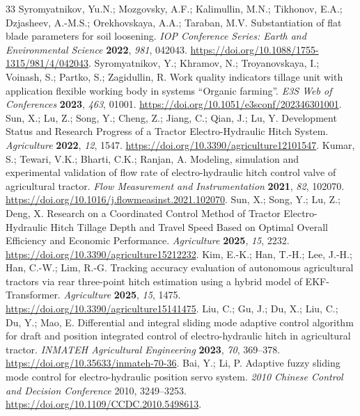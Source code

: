 \begin{thebibliography}{33}
 Syromyatnikov, Yu.N.; Mozgovsky, A.F.; Kalimullin, M.N.; Tikhonov, E.A.; Dzjasheev, A.-M.S.; Orekhovskaya, A.A.; Taraban, M.V. Substantiation of flat blade parameters for soil loosening. \emph{IOP Conference Series: Earth and Environmental Science} \textbf{2022}, \emph{981}, 042043. \url{https://doi.org/10.1088/1755-1315/981/4/042043}.
 Syromyatnikov, Y.; Khramov, N.; Troyanovskaya, I.; Voinash, S.; Partko, S.; Zagidullin, R. Work quality indicators tillage unit with application flexible working body in systems ``Organic farming''. \emph{E3S Web of Conferences} \textbf{2023}, \emph{463}, 01001. \url{https://doi.org/10.1051/e3sconf/202346301001}.
 Sun, X.; Lu, Z.; Song, Y.; Cheng, Z.; Jiang, C.; Qian, J.; Lu, Y. Development Status and Research Progress of a Tractor Electro-Hydraulic Hitch System. \emph{Agriculture} \textbf{2022}, \emph{12}, 1547. \url{https://doi.org/10.3390/agriculture12101547}.
 Kumar, S.; Tewari, V.K.; Bharti, C.K.; Ranjan, A. Modeling, simulation and experimental validation of flow rate of electro-hydraulic hitch control valve of agricultural tractor. \emph{Flow Measurement and Instrumentation} \textbf{2021}, \emph{82}, 102070. \url{https://doi.org/10.1016/j.flowmeasinst.2021.102070}.
 Sun, X.; Song, Y.; Lu, Z.; Deng, X. Research on a Coordinated Control Method of Tractor Electro-Hydraulic Hitch Tillage Depth and Travel Speed Based on Optimal Overall Efficiency and Economic Performance. \emph{Agriculture} \textbf{2025}, \emph{15}, 2232. \url{https://doi.org/10.3390/agriculture15212232}.
 Kim, E.-K.; Han, T.-H.; Lee, J.-H.; Han, C.-W.; Lim, R.-G. Tracking accuracy evaluation of autonomous agricultural tractors via rear three-point hitch estimation using a hybrid model of EKF-Transformer. \emph{Agriculture} \textbf{2025}, \emph{15}, 1475. \url{https://doi.org/10.3390/agriculture15141475}.
 Liu, C.; Gu, J.; Du, X.; Liu, C.; Du, Y.; Mao, E. Differential and integral sliding mode adaptive control algorithm for draft and position integrated control of electro-hydraulic hitch in agricultural tractor. \emph{INMATEH Agricultural Engineering} \textbf{2023}, \emph{70}, 369--378. \url{https://doi.org/10.35633/inmateh-70-36}.
 Bai, Y.; Li, P. Adaptive fuzzy sliding mode control for electro-hydraulic position servo system. \emph{2010 Chinese Control and Decision Conference} 2010, 3249--3253. \url{https://doi.org/10.1109/CCDC.2010.5498613}.

\end{thebibliography}
